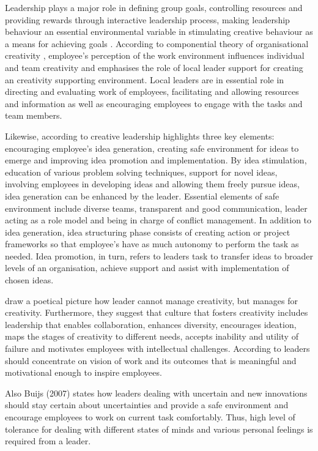 Leadership plays a major role in defining group goals, controlling resources and providing rewards through interactive leadership process, making leadership behaviour an essential environmental variable in stimulating creative behaviour as a means for achieving goals \citep{redmond1993putting}. According to componential theory of organisational creativity \citep{hennessey19881,amabile1996assessing}, employee's perception of the work environment influences individual and team creativity and emphasises the role of local leader support for creating an creativity supporting environment. Local leaders are in essential role in directing and evaluating work of employees, facilitating and allowing resources and information as well as encouraging employees to engage with the tasks and team members. \citep{amabile2004leader}
 
Likewise, according to \citet{mumford2002leading} creative leadership highlights three key elements: encouraging employee's idea generation, creating safe environment for ideas to emerge and improving idea promotion and implementation. By idea stimulation, education of various problem solving techniques, support for novel ideas, involving employees in developing ideas and allowing them freely pursue ideas, idea generation can be enhanced by the leader. Essential elements of safe environment include diverse teams, transparent and good communication, leader acting as a role model and being in charge of conflict management. In addition to idea generation, idea structuring phase consists of creating action or project frameworks so that employee's have as much autonomy to perform the task as needed. Idea promotion, in turn, refers to leaders task to transfer ideas to broader levels of an organisation, achieve support and assist with implementation of chosen ideas. \citep{mumford2002leading} 

\citet{amabile2008creativity} draw a poetical picture how leader cannot manage creativity, but manages for creativity. Furthermore, they suggest that culture that fosters creativity includes leadership that enables collaboration, enhances diversity, encourages ideation, maps the stages of creativity to different needs, accepts inability and utility of failure and motivates employees with intellectual challenges. According to \citet{sosik1999leadership} leaders should concentrate on vision of work and its outcomes that is meaningful and motivational enough to inspire employees.

Also Buijs (2007) \citet{buijs2007innovation} states how leaders dealing with uncertain and new innovations should stay certain about uncertainties and provide a safe environment and encourage employees to work on current task comfortably. Thus, high level of tolerance for dealing with different states of minds and various personal feelings is required from a leader. \citep{buijs2007innovation} 

